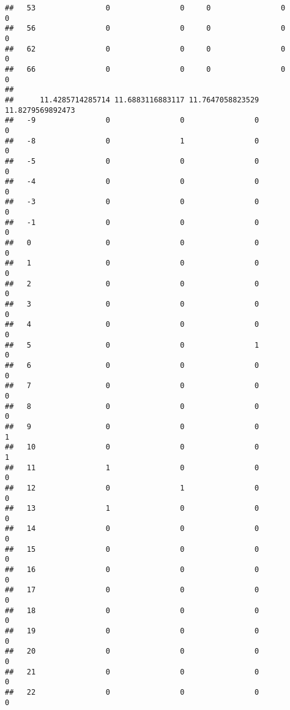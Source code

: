 \documentclass[]{article}
\begin{document}
\begin{verbatim}
##   53                0                0     0                0                0
##   56                0                0     0                0                0
##   62                0                0     0                0                0
##   66                0                0     0                0                0
##     
##      11.4285714285714 11.6883116883117 11.7647058823529 11.8279569892473
##   -9                0                0                0                0
##   -8                0                1                0                0
##   -5                0                0                0                0
##   -4                0                0                0                0
##   -3                0                0                0                0
##   -1                0                0                0                0
##   0                 0                0                0                0
##   1                 0                0                0                0
##   2                 0                0                0                0
##   3                 0                0                0                0
##   4                 0                0                0                0
##   5                 0                0                1                0
##   6                 0                0                0                0
##   7                 0                0                0                0
##   8                 0                0                0                0
##   9                 0                0                0                1
##   10                0                0                0                1
##   11                1                0                0                0
##   12                0                1                0                0
##   13                1                0                0                0
##   14                0                0                0                0
##   15                0                0                0                0
##   16                0                0                0                0
##   17                0                0                0                0
##   18                0                0                0                0
##   19                0                0                0                0
##   20                0                0                0                0
##   21                0                0                0                0
##   22                0                0                0                0

\end{verbatim}
\end{document}
